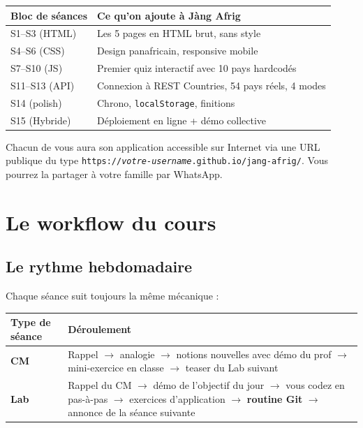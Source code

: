 \documentclass[11pt,a4paper]{article}
\begin{document}
\begin{center}
\begin{tabular}{@{}ll@{}}
\toprule
\textbf{Bloc de séances} & \textbf{Ce qu'on ajoute à Jàng Afrig} \\
\midrule
S1--S3 (HTML)    & Les 5 pages en HTML brut, sans style \\
S4--S6 (CSS)     & Design panafricain, responsive mobile \\
S7--S10 (JS)     & Premier quiz interactif avec 10 pays hardcodés \\
S11--S13 (API)   & Connexion à REST Countries, 54 pays réels, 4 modes \\
S14 (polish)     & Chrono, \texttt{localStorage}, finitions \\
S15 (Hybride)    & Déploiement en ligne + démo collective \\
\bottomrule
\end{tabular}
\end{center}

\begin{projetbox}
Chacun de vous aura son application accessible sur Internet via une URL
publique du type \texttt{https://\emph{votre-username}.github.io/jang-afrig/}.
Vous pourrez la partager à votre famille par WhatsApp.
\end{projetbox}

\newpage

\section{Le workflow du cours}

\subsection{Le rythme hebdomadaire}

Chaque séance suit toujours la même mécanique :

\begin{center}
\begin{tabular}{@{}lp{9cm}@{}}
\toprule
\textbf{Type de séance} & \textbf{Déroulement} \\
\midrule
\textbf{CM} & Rappel $\to$ analogie $\to$ notions nouvelles avec démo du prof $\to$ mini-exercice en classe $\to$ teaser du Lab suivant \\
\addlinespace
\textbf{Lab} & Rappel du CM $\to$ démo de l'objectif du jour $\to$ vous codez en pas-à-pas $\to$ exercices d'application $\to$ \textbf{routine Git} $\to$ annonce de la séance suivante \\
\bottomrule
\end{tabular}
\end{center}
\end{document}
